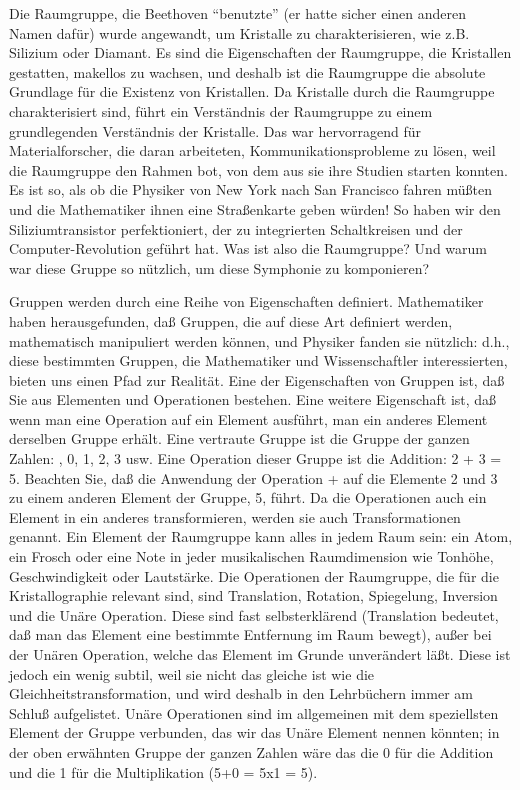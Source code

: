 Die Raumgruppe, die Beethoven \enquote{benutzte} (er hatte sicher einen anderen Namen dafür) wurde angewandt, um Kristalle zu charakterisieren, wie z.B. Silizium oder Diamant.
Es sind die Eigenschaften der Raumgruppe, die Kristallen gestatten, makellos zu wachsen, und deshalb ist die Raumgruppe die absolute Grundlage für die Existenz von Kristallen.
Da Kristalle durch die Raumgruppe charakterisiert sind, führt ein Verständnis der Raumgruppe zu einem grundlegenden Verständnis der Kristalle.
Das war hervorragend für Materialforscher, die daran arbeiteten, Kommunikationsprobleme zu lösen, weil die Raumgruppe den Rahmen bot, von dem aus sie ihre Studien starten konnten.
Es ist so, als ob die Physiker von New York nach San Francisco fahren müßten und die Mathematiker ihnen eine Straßenkarte geben würden!
So haben wir den Siliziumtransistor perfektioniert, der zu integrierten Schaltkreisen und der Computer-Revolution geführt hat.
Was ist also die Raumgruppe? Und warum war diese Gruppe so nützlich, um diese Symphonie zu komponieren?

Gruppen werden durch eine Reihe von Eigenschaften definiert.
Mathematiker haben herausgefunden, daß Gruppen, die auf diese Art definiert werden, mathematisch manipuliert werden können, und Physiker fanden sie nützlich: d.h., diese bestimmten Gruppen, die Mathematiker und Wissenschaftler interessierten, bieten uns einen Pfad zur Realität.
Eine der Eigenschaften von Gruppen ist, daß Sie aus Elementen und Operationen bestehen.
Eine weitere Eigenschaft ist, daß wenn man eine Operation auf ein Element ausführt, man ein anderes Element derselben Gruppe erhält.
Eine vertraute Gruppe ist die Gruppe der ganzen Zahlen: , 0, 1, 2, 3 usw.
Eine Operation dieser Gruppe ist die Addition: 2 + 3 = 5.
Beachten Sie, daß die Anwendung der Operation + auf die Elemente 2 und 3 zu einem anderen Element der Gruppe, 5, führt.
Da die Operationen auch ein Element in ein anderes transformieren, werden sie auch Transformationen genannt.
Ein Element der Raumgruppe kann alles in jedem Raum sein: ein Atom, ein Frosch oder eine Note in jeder musikalischen Raumdimension wie Tonhöhe, Geschwindigkeit oder Lautstärke.
Die Operationen der Raumgruppe, die für die Kristallographie relevant sind, sind Translation, Rotation, Spiegelung, Inversion und die Unäre Operation.
Diese sind fast selbsterklärend (Translation bedeutet, daß man das Element eine bestimmte Entfernung im Raum bewegt), außer bei der Unären Operation, welche das Element im Grunde unverändert läßt.
Diese ist jedoch ein wenig subtil, weil sie nicht das gleiche ist wie die Gleichheitstransformation, und wird deshalb in den Lehrbüchern immer am Schluß aufgelistet.
Unäre Operationen sind im allgemeinen mit dem speziellsten Element der Gruppe verbunden, das wir das Unäre Element nennen könnten; in der oben erwähnten Gruppe der ganzen Zahlen wäre das die 0 für die Addition und die 1 für die Multiplikation (5+0 = 5x1 = 5).

